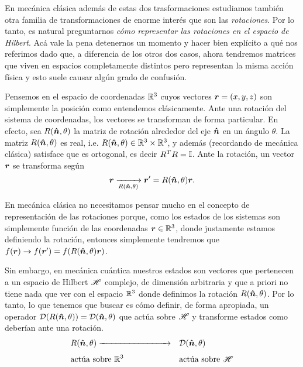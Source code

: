 \documentclass[10pt, a4paper]{article}
\numberwithin{equation}{subsection}
\begin{document}
En mecánica clásica además de estas dos trasformaciones estudiamos también otra
familia de transformaciones de enorme interés que son las \emph{rotaciones}.
Por lo tanto, es natural preguntarnos \emph{cómo representar las rotaciones en
el espacio de Hilbert}. Acá vale la pena detenernos un momento y hacer bien
explícito a qué nos referimos dado que, a diferencia de los otros dos casos,
ahora tendremos matrices que viven en espacios completamente distintos pero
representan la misma acción física y esto suele causar algún grado de
confusión.

Pensemos en el espacio de coordenadas $\mathbb{R}^3$ cuyos vectores $\vb*{r} = (x,
y, z)$ son simplemente la posición como entendemos clásicamente. Ante una
rotación del sistema de coordenadas, los vectores se transforman de forma
particular. En efecto, sea $R(\vu*{n}, \theta)$ la matriz de rotación
alrededor del eje $\vu*{n}$ en un ángulo $\theta$. La matriz $R(\vu*{n},
\theta)$ es real, i.e. $R(\vu*{n}, \theta) \in \mathbb{R}^3\times\mathbb{R}^3$, y
además (recordando de mecánica clásica) satisface que es ortogonal, es decir
$R^T R = \mathbb{I}$. Ante la rotación, un vector $\vb*{r}$ se transforma según
\begin{equation}
  \vb*{r} \xrightarrow[R(\vu*{n},\theta)]{} \vb*{r}'=
  R(\vu*{n},\theta)\vb*{r}.
\end{equation}

\bigbreak
{}
\bigbreak

En mecánica clásica no necesitamos pensar mucho en el concepto de
representación de las rotaciones porque, como los estados de los sistemas 
son simplemente función de las coordenadas $\vb*{r} \in \mathbb{R}^3$, donde
justamente estamos definiendo la rotación, entonces simplemente tendremos que
$f(\vb*{r}) \rightarrow f(\vb*{r}') = f(R(\vu*{n},\theta)\vb*{r})$.

Sin embargo, en mecánica cuántica nuestros estados son vectores que pertenecen
a un espacio de Hilbert $\mathscr{H}$ complejo, de dimensión arbitraria y que a
priori no tiene nada que ver con el espacio $\mathbb{R}^3$ donde definimos la
rotación $R(\vu*{n},\theta)$. Por lo tanto, lo que tenemos que buscar es cómo
definir, de forma apropiada, un operador $\RotationOp(R(\vers{n},\theta)) =
\RotationOp(\vers{n}, \theta)$ que actúa sobre $\mathscr{H}$ y transforme estados
como deberían ante una rotación.
\begin{alignat*}{2}
  &R(\vers{n}, \theta) \xrightarrow[\hphantom{very long text till the end}]{}
  &&\RotationOp(\vers{n}, \theta) \\
  &\text{actúa sobre } \Reals^3
  &&\text{actúa sobre } \Hilbert
\end{alignat*}
\end{document}
